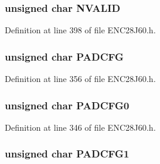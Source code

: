 \hypertarget{union___r_e_g_af6acf77b8a69a8fbdc7f10121e6ba496}{}
\subsubsection[{N\+V\+A\+L\+I\+D}]{\setlength{\rightskip}{0pt plus 5cm}unsigned {\bf char} N\+V\+A\+L\+I\+D}\label{union___r_e_g_af6acf77b8a69a8fbdc7f10121e6ba496}


Definition at line 398 of file E\+N\+C28\+J60.\+h.

\hypertarget{union___r_e_g_aec25430971958ecf8fa49dc4944c228b}{}
\subsubsection[{P\+A\+D\+C\+F\+G}]{\setlength{\rightskip}{0pt plus 5cm}unsigned {\bf char} P\+A\+D\+C\+F\+G}\label{union___r_e_g_aec25430971958ecf8fa49dc4944c228b}


Definition at line 356 of file E\+N\+C28\+J60.\+h.

\hypertarget{union___r_e_g_a2853e0c541a5f7e43347ef8e4c147e3b}{}
\subsubsection[{P\+A\+D\+C\+F\+G0}]{\setlength{\rightskip}{0pt plus 5cm}unsigned {\bf char} P\+A\+D\+C\+F\+G0}\label{union___r_e_g_a2853e0c541a5f7e43347ef8e4c147e3b}


Definition at line 346 of file E\+N\+C28\+J60.\+h.

\hypertarget{union___r_e_g_adc942c932f2a22d0bd365948f4dcc349}{}
\subsubsection[{P\+A\+D\+C\+F\+G1}]{\setlength{\rightskip}{0pt plus 5cm}unsigned {\bf char} P\+A\+D\+C\+F\+G1}\label{union___r_e_g_adc942c932f2a22d0bd365948f4dcc349}


